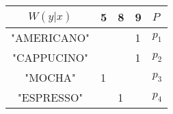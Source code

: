 \begin{tabular}{c|l|l|l||l|}
$W(y|x)$          & 5 & 8 & 9 & $P$\\
\hline
"AMERICANO" &   &  & 1  & $p_1$ \\
\hline
"CAPPUCINO" &   &   & 1  & $p_2$\\
\hline
"MOCHA"     & 1 &   &    & $p_3$\\
\hline
"ESPRESSO"  &   &  1  &   & $p_4$\\
\hline
\end{tabular}
